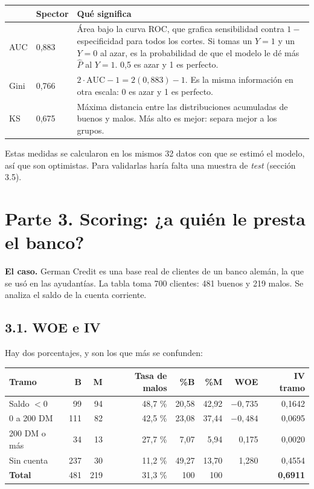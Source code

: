 \documentclass[11pt,letterpaper]{article}
\newcommand{\parte}[1]{\section*{\textcolor{azul}{#1}}}
\newcommand{\tema}[1]{\subsection*{#1}}
\newcommand{\Ph}{\hat{P}}
\begin{document}
\begin{center}
\begin{tabular}{p{1.2cm}p{1.6cm}p{12.7cm}}
\toprule
& \textbf{Spector} & \textbf{Qué significa} \\
\midrule
AUC & 0,883 & Área bajo la curva ROC, que grafica sensibilidad contra $1-$especificidad para todos los cortes. Si tomas un $Y=1$ y un $Y=0$ al azar, es la probabilidad de que el modelo le dé más $\Ph$ al $Y=1$. 0,5 es azar y 1 es perfecto. \\
Gini & 0,766 & $2\cdot\text{AUC}-1=2(0{,}883)-1$. Es la misma información en otra escala: 0 es azar y 1 es perfecto. \\
KS & 0,675 & Máxima distancia entre las distribuciones acumuladas de buenos y malos. Más alto es mejor: separa mejor a los grupos. \\
\bottomrule
\end{tabular}
\end{center}

Estas medidas se calcularon en los mismos 32 datos con que se estimó el modelo, así que son optimistas. Para validarlas haría falta una muestra de \emph{test} (sección 3.5).

\parte{Parte 3. Scoring: ¿a quién le presta el banco?}

\textbf{El caso.} German Credit es una base real de clientes de un banco alemán, la que se usó en las ayudantías. La tabla toma 700 clientes: 481 buenos y 219 malos. Se analiza el saldo de la cuenta corriente.

\tema{3.1. WOE e IV}

Hay dos porcentajes, y son los que más se confunden:

\begin{center}
\begin{tabular}{lrrrrrrr}
\toprule
\textbf{Tramo} & \textbf{B} & \textbf{M} & \textbf{Tasa de malos} & \textbf{\%B} & \textbf{\%M} & \textbf{WOE} & \textbf{IV tramo} \\
\midrule
Saldo $<0$ & 99 & 94 & 48,7 \% & 20,58 & 42,92 & $-0{,}735$ & 0,1642 \\
0 a 200 DM & 111 & 82 & 42,5 \% & 23,08 & 37,44 & $-0{,}484$ & 0,0695 \\
200 DM o más & 34 & 13 & 27,7 \% & 7,07 & 5,94 & 0,175 & 0,0020 \\
Sin cuenta & 237 & 30 & 11,2 \% & 49,27 & 13,70 & 1,280 & 0,4554 \\
\midrule
\textbf{Total} & 481 & 219 & 31,3 \% & 100 & 100 & & \textbf{0,6911} \\
\bottomrule
\end{tabular}
\end{center}
\end{document}
